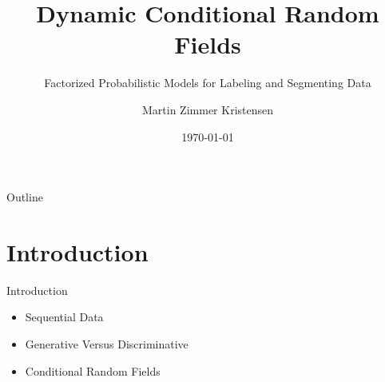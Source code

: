 \documentclass[presentation,bigger]{beamer}
\author{Martin Zimmer Kristensen}
\date{\today}
\title{Dynamic Conditional Random Fields}
\subtitle{Factorized Probabilistic Models for Labeling and Segmenting Data}
\begin{document}
\maketitle
\begin{frame}{Outline}
\setcounter{tocdepth}{1}
\tableofcontents
\end{frame}

\section{Introduction}
\label{sec:orgheadline10}
\begin{frame}[label={sec:orgheadline1}]{Introduction}
\begin{itemize}
\item Sequential Data
\item Generative Versus Discriminative
\item Conditional Random Fields
\end{itemize}
\end{frame}
\end{document}
